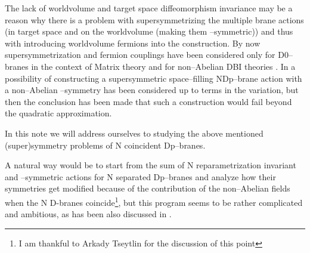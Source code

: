 \documentclass[a4paper,12pt]{article}
\begin{document}
The lack of worldvolume and target space diffeomorphism invariance
may be a reason why there is a problem with supersymmetrizing the
multiple brane actions (in target space and on the worldvolume
(making them \myHighlight{$\kappa$}\coordHE{}--symmetric)) and thus with introducing
worldvolume fermions into the construction. By now
supersymmetrization and fermion couplings have been considered
only for D0--branes in the context of Matrix theory
\cite{Taylor:2000pr} and for non--Abelian DBI theories
\cite{Ketov:2000fv,Bergshoeff:2001kt,Bergshoeff:2001dc}. In
\cite{Bergshoeff:2001kt} a possibility of constructing a
supersymmetric space--filling NDp--brane action with a
non--Abelian \myHighlight{$\kappa$}\coordHE{}--symmetry has been considered up to \coordHE{}
terms in the variation, but then the conclusion has been made
\cite{Bergshoeff:2001dc} that such a construction would fail
beyond the quadratic approximation.

In this note we will address ourselves to studying the above
mentioned (super)symmetry problems of N coincident Dp--branes.

A natural way would be to start from the sum of N
reparametrization invariant and \myHighlight{$\kappa$}\coordHE{}--symmetric actions for N
separated Dp--branes and analyze how their symmetries get modified
because of the contribution of the non--Abelian fields when the N
D-branes coincide\footnote{I am thankful to Arkady Tseytlin for
the discussion of this point}, but this program seems to be rather
complicated and ambitious, as has been also discussed in
\cite{Bergshoeff:2001kt}.
\end{document}
